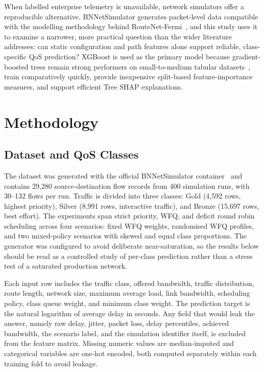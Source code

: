 \documentclass[12pt,onecolumn]{IEEEtran}
\begin{document}
When labelled enterprise telemetry is unavailable, network simulators offer a reproducible alternative. BNNetSimulator generates packet-level data compatible with the modelling methodology behind RouteNet-Fermi~\cite{bnnupc2023bnnetsimulator,ferriolgalmes2022routenetfermi}, and this study uses it to examine a narrower, more practical question than the wider literature addresses: can static configuration and path features alone support reliable, class-specific QoS prediction? XGBoost is used as the primary model because gradient-boosted trees remain strong performers on small-to-medium tabular datasets~\cite{grinsztajn2022trees,shwartzziv2022tabular}, train comparatively quickly, provide inexpensive split-based feature-importance measures, and support efficient Tree SHAP explanations.

\section{Methodology}

\subsection{Dataset and QoS Classes}

The dataset was generated with the official BNNetSimulator container~\cite{bnnupc2023bnnetsimulator} and contains 29,280 source-destination flow records from 400 simulation runs, with 30--132 flows per run. Traffic is divided into three classes: Gold (4,592 rows, highest priority), Silver (8,991 rows, interactive traffic), and Bronze (15,697 rows, best effort). The experiments span strict priority, WFQ, and deficit round robin scheduling across four scenarios: fixed WFQ weights, randomised WFQ profiles, and two mixed-policy scenarios with skewed and equal class proportions. The generator was configured to avoid deliberate near-saturation, so the results below should be read as a controlled study of per-class prediction rather than a stress test of a saturated production network.

Each input row includes the traffic class, offered bandwidth, traffic distribution, route length, network size, maximum average load, link bandwidth, scheduling policy, class queue weight, and minimum class weight. The prediction target is the natural logarithm of average delay in seconds. Any field that would leak the answer, namely raw delay, jitter, packet loss, delay percentiles, achieved bandwidth, the scenario label, and the simulation identifier itself, is excluded from the feature matrix. Missing numeric values are median-imputed and categorical variables are one-hot encoded, both computed separately within each training fold to avoid leakage.
\end{document}
